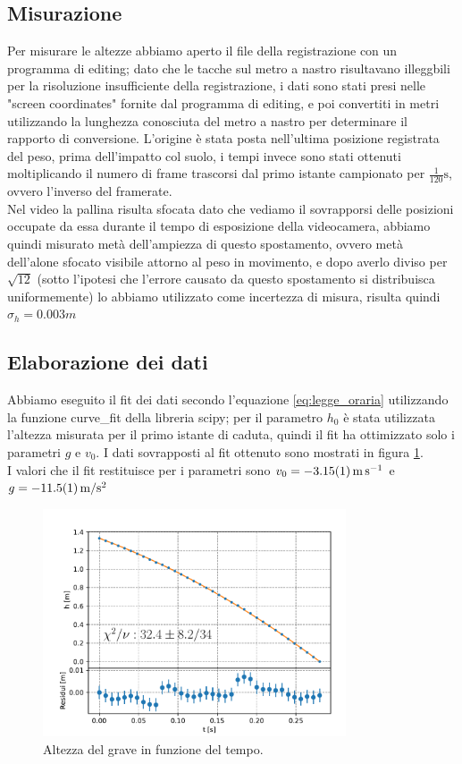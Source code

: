\documentclass[a4paper]{article}
\begin{document}
    \subsection{Misurazione}
        Per misurare le altezze abbiamo aperto il file della registrazione con un programma
        di editing; dato che le tacche sul metro a nastro risultavano illeggbili per la
        risoluzione insufficiente della registrazione, i dati sono stati presi nelle
        "screen coordinates" fornite dal programma di editing, e poi convertiti in metri
        utilizzando la lunghezza conosciuta del metro a nastro per determinare il rapporto
        di conversione. L'origine è stata posta nell'ultima posizione registrata del peso,
        prima dell'impatto col suolo, i tempi invece sono stati ottenuti moltiplicando
        il numero di frame trascorsi dal primo istante campionato per $\frac{1}{120}\si{\s}$,
        ovvero l'inverso del framerate.\\
        Nel video la pallina risulta sfocata dato che vediamo il sovrapporsi delle posizioni
        occupate da essa durante il tempo di esposizione della videocamera, abbiamo
        quindi misurato metà dell'ampiezza di questo spostamento, ovvero metà dell'alone
        sfocato visibile attorno al peso in movimento, e dopo averlo diviso per $\sqrt{12}$ 
        (sotto l'ipotesi che l'errore causato da questo spostamento si distribuisca
        uniformemente) lo abbiamo utilizzato come incertezza di misura, risulta quindi 
        $\sigma_h=0.003m$
    \subsection{Elaborazione dei dati}
    Abbiamo eseguito il fit dei dati secondo l'equazione \ref{eq:legge_oraria} utilizzando
    la funzione curve\_fit della libreria scipy; per il parametro $h_0$ è stata utilizzata
    l'altezza misurata per il primo istante di caduta, quindi il fit ha ottimizzato solo
    i parametri $g$ e $v_0$. I dati sovrapposti al fit ottenuto sono mostrati in figura
    \ref{fig:altezza}.\\
    I valori che il fit restituisce per i parametri sono $v_0=\SI{-3.15\pm 0.01}{\m\per\s}$
    e $g=\SI{-11.5\pm 0.1}{\m\per\s^2}$
    \begin{figure}[ht!]
        \centering
        \includegraphics[width=0.8\textwidth]{extra//altezza.pdf}
        \caption{Altezza del grave in funzione del tempo.}
        \label{fig:altezza}
    \end{figure}
\end{document}
